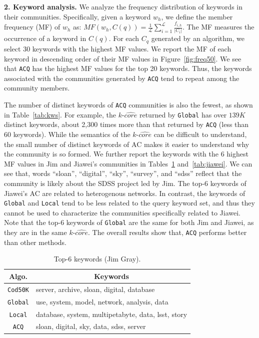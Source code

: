 {\bf 2. Keyword analysis.} We analyze the frequency distribution of keywords in their communities.
Specifically, given a keyword $w_h$, we define the member frequency (MF) of $w_h$ as:
$MF({w_h}, C(q)) = \frac{1}{\mathcal{L}}\sum\limits_{i = 1}^\mathcal{L} {\frac{{{f_{i,h}}}}{{\left| {{C_i}} \right|}}}$.
The MF measures the occurrence of a keyword in $C(q)$. For each $C_q$ generated by an algorithm, we select 30 keywords with the highest MF values. We report the MF of each keyword in descending order of their MF values in Figure~\ref{fig:freq50}.
We see that {\tt ACQ} has the highest MF values for the top 20 keywords. Thus, the keywords associated with the communities generated by {\tt ACQ} tend to repeat among the community members.

The number of distinct keywords of {\tt ACQ} communities is also the fewest, as shown in Table~\ref{tab:kws}.
For example, the $k$-$\widehat{core}$ returned by {\tt Global} has over $139K$ distinct keywords,
about 2,300 times more than that returned by {\tt ACQ} (less than 60 keywords). While the semantics of the $k$-$\widehat{core}$ can be difficult to understand, the small number of distinct keywords of AC makes it easier to understand why the community is so formed. We further report the keywords with the 6 highest MF values in Jim and Jiawei's communities in Tables~\ref{tab:jim} and~\ref{tab:jiawei}. We can see that, words ``sloan'',  ``digital'', ``sky'', ``survey'', and ``sdss'' reflect that the community is likely about the SDSS project led by Jim. The top-6 keywords of Jiawei's AC are related to heterogenous networks. In contrast, the keywords of {\tt Global} and {\tt Local} tend to be less related to the query keyword set, and thus they cannot be used to characterize the communities specifically related to Jiawei.
Note that the top-6 keywords of {\tt Global} are the same for both Jim and Jiawei, as they are in the same $k$-$\widehat{core}$.
The overall results show that, {\tt ACQ} performs better than other methods.

\begin{table}[htp]
  \centering \footnotesize \caption {Top-6 keywords (Jim Gray).}
  \label{tab:jim}
  \begin{tabular}{c|l}
     \hline
          \bf{Algo.}   & \multicolumn{1}{c}{\textbf{Keywords}}\\
     \hline\hline
          {\tt Cod50K} & server, archive, sloan, digital, database\\
     \hline
          {\tt Global} & use, system, model, network, analysis, data\\
     \hline
          {\tt Local}  & database, system, multipetabyte, data, lsst, story\\
     \hline
          {\tt ACQ}    & sloan, digital, sky, data, sdss, server\\
     \hline
  \end{tabular}
\end{table}


